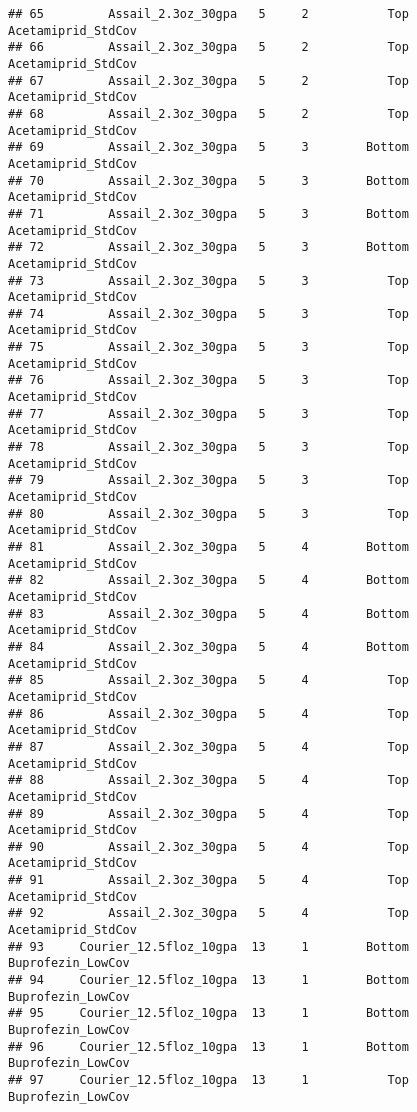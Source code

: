 \documentclass[
]{article}
\begin{document}
\begin{verbatim}
## 65         Assail_2.3oz_30gpa   5     2           Top     Acetamiprid_StdCov
## 66         Assail_2.3oz_30gpa   5     2           Top     Acetamiprid_StdCov
## 67         Assail_2.3oz_30gpa   5     2           Top     Acetamiprid_StdCov
## 68         Assail_2.3oz_30gpa   5     2           Top     Acetamiprid_StdCov
## 69         Assail_2.3oz_30gpa   5     3        Bottom     Acetamiprid_StdCov
## 70         Assail_2.3oz_30gpa   5     3        Bottom     Acetamiprid_StdCov
## 71         Assail_2.3oz_30gpa   5     3        Bottom     Acetamiprid_StdCov
## 72         Assail_2.3oz_30gpa   5     3        Bottom     Acetamiprid_StdCov
## 73         Assail_2.3oz_30gpa   5     3           Top     Acetamiprid_StdCov
## 74         Assail_2.3oz_30gpa   5     3           Top     Acetamiprid_StdCov
## 75         Assail_2.3oz_30gpa   5     3           Top     Acetamiprid_StdCov
## 76         Assail_2.3oz_30gpa   5     3           Top     Acetamiprid_StdCov
## 77         Assail_2.3oz_30gpa   5     3           Top     Acetamiprid_StdCov
## 78         Assail_2.3oz_30gpa   5     3           Top     Acetamiprid_StdCov
## 79         Assail_2.3oz_30gpa   5     3           Top     Acetamiprid_StdCov
## 80         Assail_2.3oz_30gpa   5     3           Top     Acetamiprid_StdCov
## 81         Assail_2.3oz_30gpa   5     4        Bottom     Acetamiprid_StdCov
## 82         Assail_2.3oz_30gpa   5     4        Bottom     Acetamiprid_StdCov
## 83         Assail_2.3oz_30gpa   5     4        Bottom     Acetamiprid_StdCov
## 84         Assail_2.3oz_30gpa   5     4        Bottom     Acetamiprid_StdCov
## 85         Assail_2.3oz_30gpa   5     4           Top     Acetamiprid_StdCov
## 86         Assail_2.3oz_30gpa   5     4           Top     Acetamiprid_StdCov
## 87         Assail_2.3oz_30gpa   5     4           Top     Acetamiprid_StdCov
## 88         Assail_2.3oz_30gpa   5     4           Top     Acetamiprid_StdCov
## 89         Assail_2.3oz_30gpa   5     4           Top     Acetamiprid_StdCov
## 90         Assail_2.3oz_30gpa   5     4           Top     Acetamiprid_StdCov
## 91         Assail_2.3oz_30gpa   5     4           Top     Acetamiprid_StdCov
## 92         Assail_2.3oz_30gpa   5     4           Top     Acetamiprid_StdCov
## 93     Courier_12.5floz_10gpa  13     1        Bottom      Buprofezin_LowCov
## 94     Courier_12.5floz_10gpa  13     1        Bottom      Buprofezin_LowCov
## 95     Courier_12.5floz_10gpa  13     1        Bottom      Buprofezin_LowCov
## 96     Courier_12.5floz_10gpa  13     1        Bottom      Buprofezin_LowCov
## 97     Courier_12.5floz_10gpa  13     1           Top      Buprofezin_LowCov

\end{verbatim}
\end{document}
